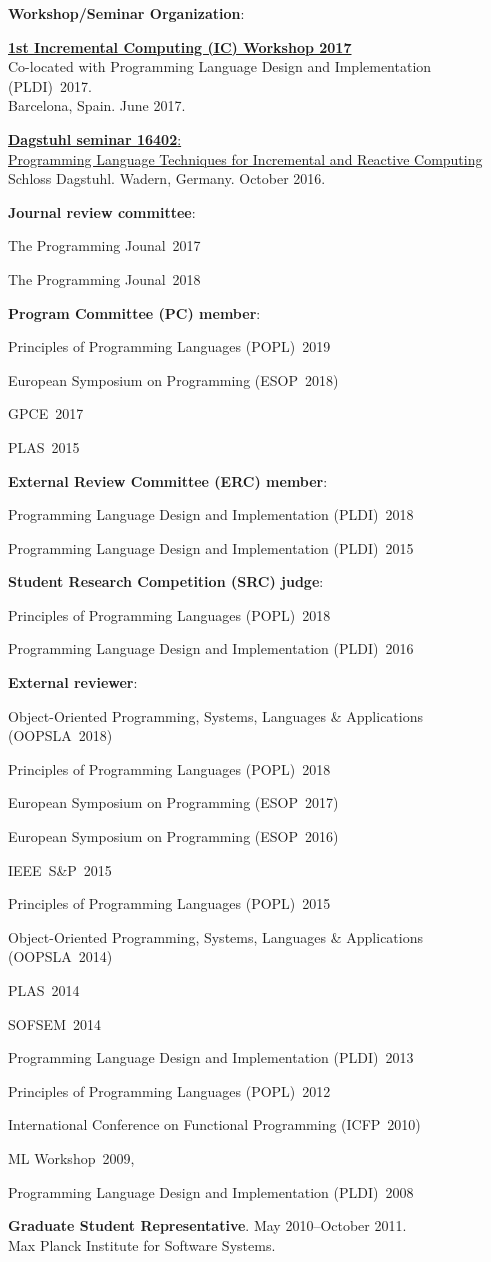 \documentclass[10pt,letterpaper]{article}
\newcommand{\ReviewItem}[1]{\item #1}
\newcommand{\ReviewItemsBegin}{\begin{itemize}}
\newcommand{\ReviewItemsEnd}{\end{itemize}}
\newcommand{\POPL}[1]{Principles of Programming Languages (POPL)~#1}
\newcommand{\PLDI}[1]{Programming Language Design and Implementation (PLDI)~#1}
\newcommand{\OOPSLA}[1]{Object-Oriented Programming, Systems, Languages \& Applications (OOPSLA~#1)}
\newcommand{\ICFP}[1]{International Conference on Functional Programming (ICFP~#1)}
\newcommand{\ESOP}[1]{European Symposium on Programming (ESOP~#1)}
\newcommand{\Programming}[1]{The Programming Jounal~#1}
\newcommand{\PLAS}[1]{PLAS~#1}
\newcommand{\SOFSEM}[1]{SOFSEM~#1}
\newcommand{\MLWorkshop}[1]{ML Workshop~#1}
\newcommand{\IEEESP}[1]{IEEE~S\&P~#1}
\newcommand{\GPCE}[1]{GPCE~#1}
\renewenvironment{itemize}{
  \begin{list}{}{
    \setlength{\leftmargin}{1.5em}
    \setlength{\itemsep}{0.25em}
    \setlength{\parskip}{0pt}
    \setlength{\parsep}{0.25em}
  }
}{
  \end{list}
}
\begin{document}
\begin{itemize}

\item \textbf{Workshop/Seminar Organization}:

\ReviewItemsBegin
\ReviewItem{
{\href{https://pldi17.sigplan.org/track/ic-2017-papers}
{\textbf{1st Incremental Computing (IC) Workshop 2017}}}
\\
Co-located with \PLDI{2017}.\\
Barcelona, Spain. June 2017.
}
\ReviewItem{
{\href{http://drops.dagstuhl.de/opus/volltexte/2017/6949/}
{\textbf{Dagstuhl seminar 16402}: 
\\
Programming Language Techniques for Incremental and Reactive Computing}}
\\
Schloss Dagstuhl. Wadern, Germany. October 2016.
}
\ReviewItemsEnd

\item \textbf{Journal review committee}:
\ReviewItemsBegin
\ReviewItem{\Programming{2017}}
\ReviewItem{\Programming{2018}}
\ReviewItemsEnd

\item \textbf{Program Committee (PC) member}:
\ReviewItemsBegin
\ReviewItem{\POPL{2019}}
\ReviewItem{\ESOP{2018}}
\ReviewItem{\GPCE{2017}}
\ReviewItem{\PLAS{2015}}
\ReviewItemsEnd

\item \textbf{External Review Committee (ERC) member}: 
\ReviewItemsBegin
\ReviewItem{\PLDI{2018}}
\ReviewItem{\PLDI{2015}}
\ReviewItemsEnd

\item \textbf{Student Research Competition (SRC) judge}:
\ReviewItemsBegin
\ReviewItem{\POPL{2018}}
\ReviewItem{\PLDI{2016}}
\ReviewItemsEnd

\item \textbf{External reviewer}:
\ReviewItemsBegin
\ReviewItem{\OOPSLA{2018}}
\ReviewItem{\POPL{2018}}
\ReviewItem{\ESOP{2017}}
\ReviewItem{\ESOP{2016}} 
\ReviewItem{\IEEESP{2015}}
\ReviewItem{\POPL{2015}} %
\ReviewItem{\OOPSLA{2014}} %
\ReviewItem{\PLAS{2014}} %
\ReviewItem{\SOFSEM{2014}} %
\ReviewItem{\PLDI{2013}} %
\ReviewItem{\POPL{2012}} 
\ReviewItem{\ICFP{2010}} 
\ReviewItem{\MLWorkshop{2009}},
\ReviewItem{\PLDI{2008}}
\ReviewItemsEnd

\item \textbf{Graduate Student Representative}.  
  May 2010--October 2011.
  \\
  Max Planck Institute for Software Systems.
 
\end{itemize}
\end{document}
